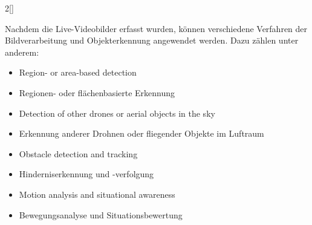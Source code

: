 \begin{paracol}{2}[]
\colger

Nachdem die Live-Videobilder erfasst wurden, können verschiedene Verfahren der Bildverarbeitung und Objekterkennung angewendet werden. Dazu zählen unter anderem:

\coleng

\begin{itemize}
\item Region- or area-based detection
\end{itemize}

\colger

\begin{itemize}
\item Regionen- oder flächenbasierte Erkennung
\end{itemize}

\coleng

\begin{itemize}
\item Detection of other drones or aerial objects in the sky
\end{itemize}

\colger

\begin{itemize}
\item Erkennung anderer Drohnen oder fliegender Objekte im Luftraum
\end{itemize}

\coleng

\begin{itemize}
\item Obstacle detection and tracking
\end{itemize}

\colger

\begin{itemize}
\item Hinderniserkennung und -verfolgung
\end{itemize}

\coleng

\begin{itemize}
\item Motion analysis and situational awareness
\end{itemize}

\colger

\begin{itemize}
\item Bewegungsanalyse und Situationsbewertung
\end{itemize}

\coleng


\end{paracol}
